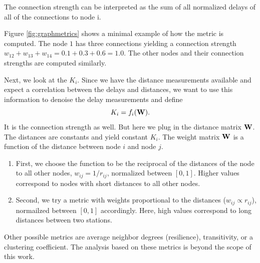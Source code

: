 \documentclass[12pt, sumlimits, intlimits]{article}
\begin{document}
The connection strength can be interpreted as the sum of all normalized delays of all of the connections to node i.

%

Figure \ref{fig:graphmetrics} shows a minimal example of how the metric is computed. The node $1$ has three connections yielding a connection strength $w_{12} + w_{13} + w_{14} = 0.1+0.3+0.6=1.0$. The other nodes and their connection strengths are computed similarly. 

Next, we look at the $K_i$. Since we have the distance measurements available and expect a correlation between the delays and distances, we want to use this information to denoise the delay measurements and define
\begin{equation}
K_i=f_i(\bf{W}).
\end{equation}
It is the connection strength as well. But here we plug in the distance matrix $\bf{W}$. The distances are constants and yield constant $K_i$.
The weight matrix $\bf{W}$ is a function of the distance between node $i$ and node $j$.
\begin{enumerate}
	\item First, we choose the function to be the reciprocal of the distances of the node to all other nodes, $w_{ij}= 1/r_{ij}$, normalized between $[0,1]$. Higher values correspond to nodes with short distances to all other nodes.
	\item Second, we try a metric with weights proportional to the distances ($w_{ij} \propto r_{ij}$), normailzed between $[0,1]$ accordingly. Here, high values correspond to long distances between two stations.
\end{enumerate}
Other possible metrics are average neighbor degrees (resilience), transitivity, or a clustering coefficient. The analysis based on these metrics is beyond the scope of this work.  
\end{document}
